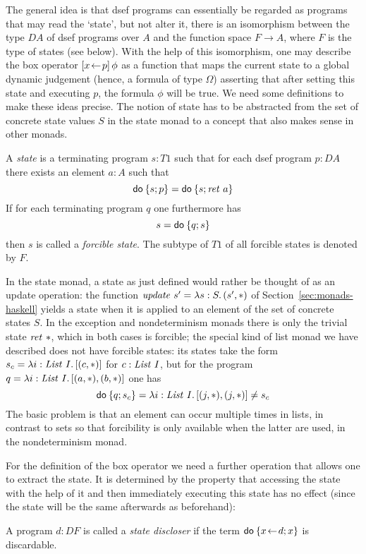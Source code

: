 The general idea is that dsef programs can essentially be regarded as programs
that may read the `state', but not alter it, \IE there is an isomorphism between
the type $D A$ of dsef programs over $A$ and the function space $F \to A$, where
$F$ is the type of states (see below). With the help of this isomorphism, one
may describe the box operator $[x\!\gets\! p]\,\phi$ as a function that maps the
current state to a global dynamic judgement (hence, a formula of type $\Omega$)
asserting that after setting this state and executing $p$, the formula $\phi$ will
be true. We need some definitions to make these ideas precise.
The notion of state has to be abstracted
from the  set of concrete state values $S$ in the state monad to a concept that
also makes sense in other monads.

\begin{defn}
  A \emph{state} is a terminating program $s : T1$ such that for each dsef
  program $p : DA$ there exists an element $a : A$ such that
  \[ \mathsf{do}\: \{s; p\} = \mathsf{do}\: \{s; \mathit{ret}~a\} \]
  If for each terminating program $q$ one furthermore has
  \[ s             = \mathsf{do}\: \{q; s\} \]
  then $s$ is called a \emph{forcible state}. The subtype of $T1$ of all
  forcible states is denoted by $F$.
\end{defn}

In the state monad, a state as just defined would rather be thought of as an
update operation: the function $\mathit{update}\ s' = {\lambda s:S.\,(s',
  \ast)}$ of Section~\ref{sec:monads-haskell} yields a state when it is applied
to an element of the  set of concrete states $S$. In the exception and
nondeterminism monads there is only the trivial state $\mathit{ret}~\ast$, which in
both cases is forcible; the special kind of list monad we have described does
not have forcible states: its states take the form $s_c = {\lambda i :
  \mathit{List}\ I.\,[(c, \ast)]}$ for $c : \mathit{List}\ I$, but for the program
$q = {\lambda i:\mathit{List}\ I.\,[(a, \ast), (b, \ast)]}$ one has
\[
  \mathsf{do}\: \{q; s_c\} = {\lambda i:\mathit{List}\ I.\,[(j,\ast), (j,\ast)]} \neq s_c
\]
The basic problem is that an element can occur multiple times in lists, in
contrast to sets so that forcibility is only available when the latter are used,
\EG in the nondeterminism monad.


For the definition of the box operator we need a further operation that allows
one to extract the state. It is determined by the property that accessing the
state with the help of it and then immediately executing this state has no effect
(since the state will be the same afterwards as beforehand):
\begin{defn}
  A program $d : DF$ is called a \emph{state discloser} if the term
  $\mathsf{do}\: \{x\!\gets\! d; x\}$ is discardable.
\end{defn}

